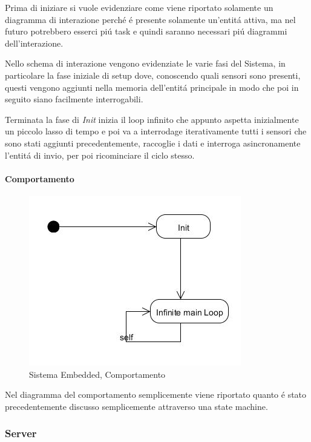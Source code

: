 Prima di iniziare si vuole evidenziare come viene riportato solamente un diagramma di interazione perch\'e \'e presente solamente un'entit\'a attiva, ma nel futuro potrebbero esserci pi\'u task e quindi saranno necessari pi\'u diagrammi dell'interazione.

Nello schema di interazione vengono evidenziate le varie fasi del Sistema, in particolare la fase iniziale di setup dove, conoscendo quali sensori sono presenti, questi vengono aggiunti nella memoria dell'entit\'a principale in modo che poi in seguito siano facilmente interrogabili.

Terminata la fase di \textit{Init} inizia il loop infinito che appunto aspetta inizialmente un piccolo lasso di tempo e poi va a interrodage iterativamente tutti i sensori che sono stati aggiunti precedentemente, raccoglie i dati e interroga asincronamente l'entit\'a di invio, per poi ricominciare il ciclo stesso.

\paragraph{Comportamento}

\begin{figure}[H]
\centering
\includegraphics[scale=0.5]{Figures/DomainModel/EmbeddedSystem/Behaviour.jpg}
\caption{Sistema Embedded, Comportamento}
\end{figure}


Nel diagramma del comportamento semplicemente viene riportato quanto \'e stato precedentemente discusso semplicemente attraverso una state machine.

\subsubsection{Server}

